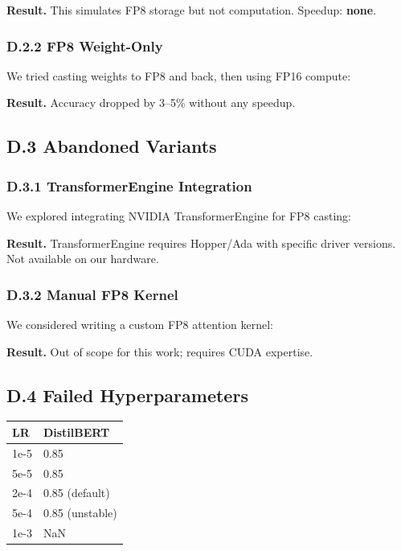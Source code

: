 \textbf{Result.} This simulates FP8 storage but not computation. Speedup: \textbf{none}.

\subsubsection{D.2.2 FP8 Weight-Only}

We tried casting weights to FP8 and back, then using FP16 compute:

\textbf{Result.} Accuracy dropped by 3--5\% without any speedup.

\subsection{D.3 Abandoned Variants}

\subsubsection{D.3.1 TransformerEngine Integration}

We explored integrating NVIDIA TransformerEngine for FP8 casting:

\textbf{Result.} TransformerEngine requires Hopper/Ada with specific driver 
versions. Not available on our hardware.

\subsubsection{D.3.2 Manual FP8 Kernel}

We considered writing a custom FP8 attention kernel:

\textbf{Result.} Out of scope for this work; requires CUDA expertise.

\subsection{D.4 Failed Hyperparameters}

\begin{table}[H]
\centering
\small
\begin{tabular}{ll}
\toprule
\textbf{LR} & \textbf{DistilBERT} \\
\midrule
1e-5 & 0.85 \\
5e-5 & 0.85 \\
2e-4 & 0.85 (default) \\
5e-4 & 0.85 (unstable) \\
1e-3 & NaN \\
\bottomrule
\end{tabular}
\end{table}

